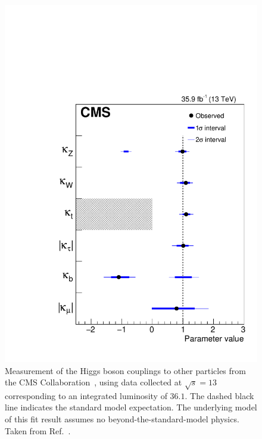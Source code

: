 \begin{figure}[hbtp]
  \begin{center}
    \includegraphics[width=\halflinewidth]{img/cmscombcouplings.pdf}
    \caption{%
        Measurement of the Higgs boson couplings to other particles from the CMS Collaboration~\cite{Sirunyan:2018koj}, using data collected at $\sqrt{s}=13$\TeV corresponding to an integrated luminosity of $36.1$\fbinv.
        The dashed black line indicates the standard model expectation.
        The underlying model of this fit result assumes no beyond-the-standard-model physics.
        Taken from Ref.~\cite{Sirunyan:2018koj}.
        }
    \label{fig:productiondecay}
  \end{center}
\end{figure}


